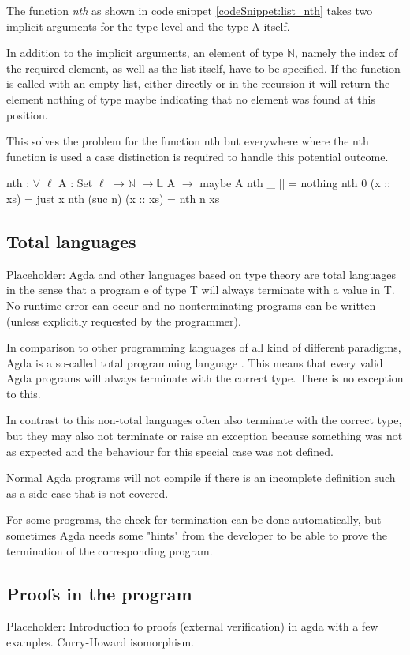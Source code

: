 The function \emph{nth} as shown in code snippet \ref{codeSnippet:list_nth} takes two implicit arguments for the type level and the type A itself.

In addition to the implicit arguments, an element of type $\mathbb{N}$, namely the index of the required element, as well as the list itself, have to be specified.
If the function is called with an empty list, either directly or in the recursion it will return the element nothing of type maybe indicating that no element was found at this position.

This solves the problem for the function nth but everywhere where the nth function is used a case distinction is required to handle this potential outcome.
\begin{codesnippet}[mathescape=true, caption={Definition of nth function in Agda}, label={codeSnippet:list_nth}]
nth : $\forall$ {$\ell$} {A : Set $\ell$} $\rightarrow \mathbb{N}$ $\rightarrow \mathbb{L}$ A $\rightarrow$ maybe A
nth _ [] = nothing
nth 0 (x :: xs) = just x
nth (suc n) (x :: xs) = nth n xs
\end{codesnippet}

\subsection{Total languages}\label{section:total_languages}
Placeholder: Agda and other languages based on type theory are total languages in the sense that a program e of type T will always terminate with a value in T. 
No runtime error can occur and no nonterminating programs can be written (unless explicitly requested by the programmer)\cite{AgdaReadTheDocs}.

In comparison to other programming languages of all kind of different paradigms, Agda is a so-called total programming language \cite{AgdaReadTheDocs}.
This means that every valid Agda programs will always terminate with the correct type. There is no exception to this.

In contrast to this non-total languages often also terminate with the correct type, but they may also not terminate or raise an exception because something was not as expected and the behaviour for this special case was not defined.

Normal Agda programs will not compile if there is an incomplete definition such as a side case that is not covered.

For some programs, the check for termination can be done automatically, but sometimes Agda needs some "hints" from the developer to be able to prove the termination of the corresponding program.

\subsection{Proofs in the program}
Placeholder: Introduction to proofs (external verification) in agda with a few examples.
Curry-Howard isomorphism.
\cite{norell:deptyped, 10.1145/2841316, plfa2019}

